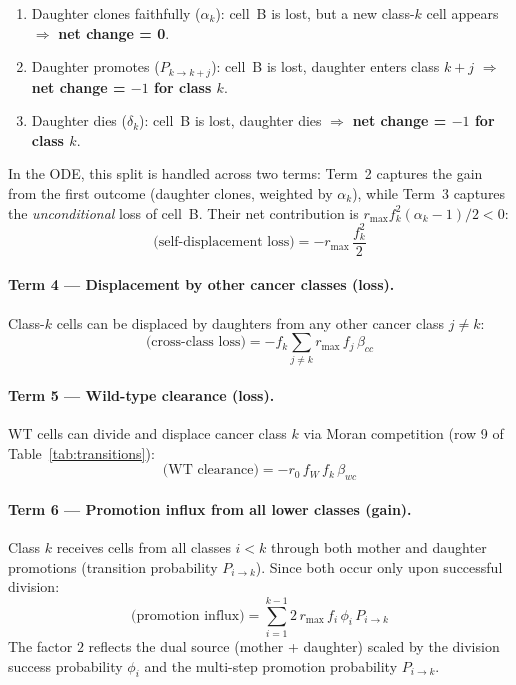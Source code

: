 \documentclass[11pt,a4paper]{article}
\begin{document}
\begin{enumerate}
    \item[\textbullet] Daughter clones faithfully ($\alpha_k$): cell~B is lost, but a new class-$k$ cell appears $\Rightarrow$ \textbf{net change = 0}.
    \item[\textbullet] Daughter promotes ($P_{k \to k+j}$): cell~B is lost, daughter enters class $k+j$ $\Rightarrow$ \textbf{net change = $-1$ for class $k$}.
    \item[\textbullet] Daughter dies ($\delta_k$): cell~B is lost, daughter dies $\Rightarrow$ \textbf{net change = $-1$ for class $k$}.
\end{enumerate}

In the ODE, this split is handled across two terms: Term~2 captures the gain from the first outcome (daughter clones, weighted by $\alpha_k$), while Term~3 captures the \emph{unconditional} loss of cell~B. Their net contribution is $r_{\text{max}} f_k^2 (\alpha_k - 1)/2 < 0$:
\begin{equation}
    \text{(self-displacement loss)} = -r_{\text{max}}\, \frac{f_k^2}{2}
\end{equation}

\paragraph{Term 4 --- Displacement by other cancer classes (loss).} Class-$k$ cells can be displaced by daughters from any other cancer class $j \neq k$:
\begin{equation}
    \text{(cross-class loss)} = -f_k \sum_{j \neq k} r_{\text{max}}\, f_j\, \beta_{cc}
\end{equation}

\paragraph{Term 5 --- Wild-type clearance (loss).} WT cells can divide and displace cancer class $k$ via Moran competition (row 9 of Table~\ref{tab:transitions}):
\begin{equation}
    \text{(WT clearance)} = -r_0\, f_W\, f_k\, \beta_{wc}
\end{equation}

\paragraph{Term 6 --- Promotion influx from all lower classes (gain).} Class $k$ receives cells from all classes $i < k$ through both mother and daughter promotions (transition probability $P_{i \to k}$). Since both occur only upon successful division:
\begin{equation}
    \text{(promotion influx)} = \sum_{i=1}^{k-1} 2\, r_{\text{max}}\, f_i\, \phi_i\, P_{i \to k}
\end{equation}
The factor $2$ reflects the dual source (mother + daughter) scaled by the division success probability $\phi_i$ and the multi-step promotion probability $P_{i \to k}$.
\end{document}

